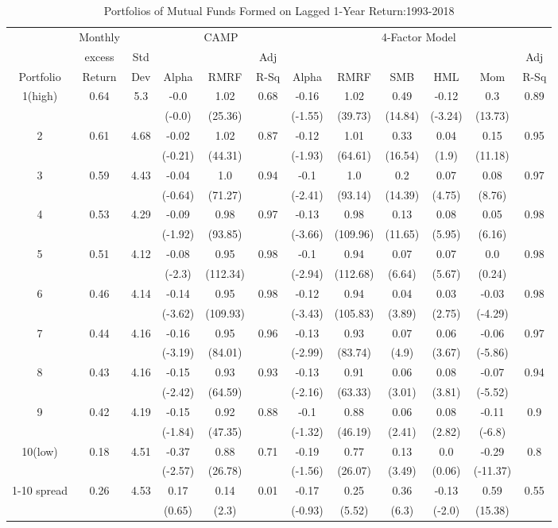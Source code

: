 \documentclass[a4paper]{article}
\begin{document}
\begin{table}[h!]
    \centering
    \begin{tabular}{c cc ccc cccccc} 
    \toprule[1.5pt]
      &  Monthly &  & \multicolumn{3}{c}{CAMP} &  \multicolumn{6}{c}{4-Factor Model}\\
      & excess& Std &   &  & Adj &   &  &  &  &  & Adj\\
     Portfolio & Return & Dev & Alpha  & RMRF & R-Sq &  Alpha  & RMRF & SMB & HML & Mom &  R-Sq\\
    
    \toprule[1.5pt]
    1(high)&0.64&5.3&-0.0&1.02&0.68&-0.16&1.02&0.49&-0.12&0.3&0.89\\
    &&&(-0.0)&(25.36)&&(-1.55)&(39.73)&(14.84)&(-3.24)&(13.73)&\\
    2&0.61&4.68&-0.02&1.02&0.87&-0.12&1.01&0.33&0.04&0.15&0.95\\
    &&&(-0.21)&(44.31)&&(-1.93)&(64.61)&(16.54)&(1.9)&(11.18)&\\
    3&0.59&4.43&-0.04&1.0&0.94&-0.1&1.0&0.2&0.07&0.08&0.97\\
    &&&(-0.64)&(71.27)&&(-2.41)&(93.14)&(14.39)&(4.75)&(8.76)&\\
    4&0.53&4.29&-0.09&0.98&0.97&-0.13&0.98&0.13&0.08&0.05&0.98\\
    &&&(-1.92)&(93.85)&&(-3.66)&(109.96)&(11.65)&(5.95)&(6.16)&\\
    5&0.51&4.12&-0.08&0.95&0.98&-0.1&0.94&0.07&0.07&0.0&0.98\\
    &&&(-2.3)&(112.34)&&(-2.94)&(112.68)&(6.64)&(5.67)&(0.24)&\\
    6&0.46&4.14&-0.14&0.95&0.98&-0.12&0.94&0.04&0.03&-0.03&0.98\\
    &&&(-3.62)&(109.93)&&(-3.43)&(105.83)&(3.89)&(2.75)&(-4.29)&\\
    7&0.44&4.16&-0.16&0.95&0.96&-0.13&0.93&0.07&0.06&-0.06&0.97\\
    &&&(-3.19)&(84.01)&&(-2.99)&(83.74)&(4.9)&(3.67)&(-5.86)&\\
    8&0.43&4.16&-0.15&0.93&0.93&-0.13&0.91&0.06&0.08&-0.07&0.94\\
    &&&(-2.42)&(64.59)&&(-2.16)&(63.33)&(3.01)&(3.81)&(-5.52)&\\
    9&0.42&4.19&-0.15&0.92&0.88&-0.1&0.88&0.06&0.08&-0.11&0.9\\
    &&&(-1.84)&(47.35)&&(-1.32)&(46.19)&(2.41)&(2.82)&(-6.8)&\\
    10(low)&0.18&4.51&-0.37&0.88&0.71&-0.19&0.77&0.13&0.0&-0.29&0.8\\
    &&&(-2.57)&(26.78)&&(-1.56)&(26.07)&(3.49)&(0.06)&(-11.37)&\\
    1-10 spread&0.26&4.53&0.17&0.14&0.01&-0.17&0.25&0.36&-0.13&0.59&0.55\\
    &&&(0.65)&(2.3)&&(-0.93)&(5.52)&(6.3)&(-2.0)&(15.38)&\\
    
    \toprule[1.5pt]
    \end{tabular}
    \caption{Portfolios of Mutual Funds Formed on Lagged 1-Year Return:1993-2018}
    \label{table:1}
    \end{table}
\end{document}
